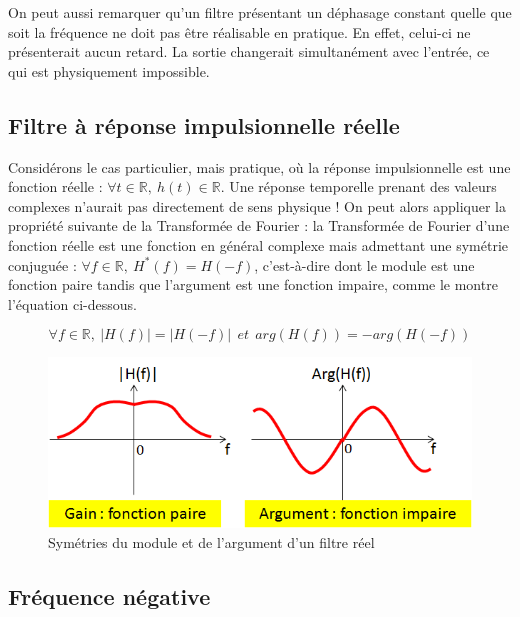 	On peut aussi remarquer qu'un filtre présentant un déphasage constant quelle que soit la fréquence ne doit pas être réalisable en pratique. En effet, celui-ci ne présenterait aucun retard. La sortie changerait simultanément avec l'entrée, ce qui est physiquement impossible.
	
	\vspace{1\baselineskip}
	
	\subsection{Filtre à réponse impulsionnelle réelle}
	Considérons le cas particulier, mais pratique, où la réponse impulsionnelle est une fonction réelle : $ \forall t \in \mathbb{R},~h(t) \in \mathbb{R}$. Une réponse temporelle prenant des valeurs complexes n’aurait pas directement de sens physique ! On peut alors appliquer la propriété suivante de la Transformée de Fourier : la Transformée de Fourier d’une fonction réelle est une fonction en général complexe mais admettant une symétrie conjuguée : $\forall f \in \mathbb{R},~H^{*}(f) = H(-f)$, c'est-à-dire dont le module est une fonction paire tandis que l’argument est une fonction impaire, comme le montre l'équation ci-dessous. 
	
	\begin{equation}\label{key}
	\forall f \in \mathbb{R},~|H(f)| = |H(-f)| ~~et~~arg(H(f)) = -arg(H(-f))
	\end{equation}
	
	\begin{figure}[h]
		\centering
		\includegraphics[scale=0.6]{images/symetrie_filtre_reel.png}
		\caption{Symétries du module et de l'argument d'un filtre réel}	
		\label{Fig:symetrie_filtre_reel} 
	\end{figure}
	 
	
	\subsection{Fréquence négative}
	
